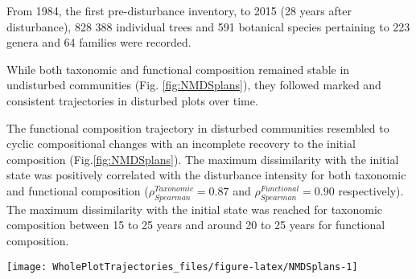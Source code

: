 \documentclass[fleqn,10pt]{ArtEcoFoG} %
\begin{document}
From 1984, the first pre-disturbance inventory, to 2015 (28 years after
disturbance), 828 388 individual trees and 591 botanical species
pertaining to 223 genera and 64 families were recorded.

While both taxonomic and functional composition remained stable in
undisturbed communities (Fig. \ref{fig:NMDSplans}), they followed marked
and consistent trajectories in disturbed plots over time.

The functional composition trajectory in disturbed communities resembled
to cyclic compositional changes with an incomplete recovery to the
initial composition (Fig.\ref{fig:NMDSplans}). The maximum dissimilarity
with the initial state was positively correlated with the disturbance
intensity for both taxonomic and functional composition
(\(\rho_{Spearman}^{Taxonomic}=0.87\) and
\(\rho_{Spearman}^{Functional}=0.90\) respectively). The maximum
dissimilarity with the initial state was reached for taxonomic
composition between 15 to 25 years and around 20 to 25 years for
functional composition.

\begin{figure*}

{\centering \texttt{[image: WholePlotTrajectories\_files/figure-latex/NMDSplans-1]} 

}

\caption{Plot trajectories in terms of taxonomic composition (\textbf{(a)} and \textbf{(c)}) and functional composition (\textbf{(b)} and \textbf{(d)}) in a two-dimensional NMDS plane. Lower panels (\textbf{(c)} and \textbf{(d)}) represent the Euclidean distance to initial condition along the 30 sampled years. Shaded areas are the credibility intervals.}\label{fig:NMDSplans}
\end{figure*}
\end{document}
